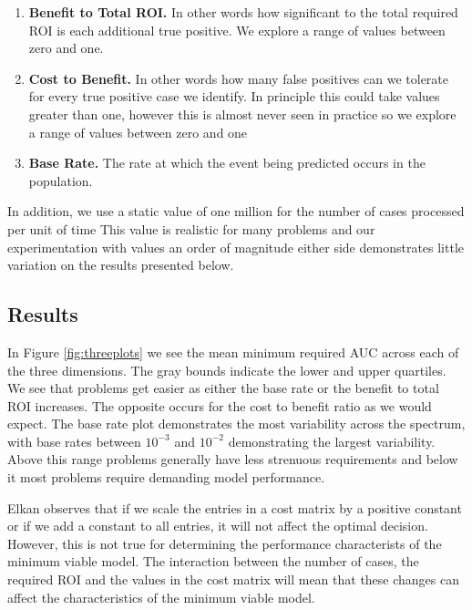 \documentclass[12pt,a4paper]{article}
\numberwithin{equation}{section}
\begin{document}
\begin{enumerate}
        \item \textbf{Benefit to Total ROI.} In other words how significant to the total required ROI is
each additional true positive. We explore a range of values between zero and one.

        \item \textbf{Cost to Benefit.} In other words how many false positives can we tolerate for every
true positive case we identify. In principle this could take values greater than one, however this
is almost never seen in practice so we explore a range of values between zero and one

        \item \textbf{Base Rate.} The rate at which the event being predicted occurs in the population.

\end{enumerate}

In addition, we use a static value of one million for the number of cases processed per unit of time
This value is realistic for many problems and our experimentation with values
an order of magnitude either side demonstrates little variation on the results presented below.

\subsection{Results}

In Figure \ref{fig:threeplots} we see the mean minimum required AUC across each of the three dimensions.
The gray bounds indicate the lower and upper quartiles. We see that problems get easier as either the base
rate or the benefit to total ROI increases. The opposite occurs for the cost to benefit ratio as we would 
expect. The base rate plot demonstrates the most variability across the spectrum, with base rates between
$10^{-3}$ and $10^{-2}$ demonstrating the largest variability. Above this range problems generally have less
strenuous requirements and below it most problems require demanding model performance.

Elkan \cite{Elkan2001} observes that if we scale the entries in a cost matrix by a positive constant or if
we add a constant to all entries, it will not affect the optimal decision. However, this
is not true for determining the performance characterists of the minimum viable model. 
The interaction between the number of cases, the required ROI and the values in the cost
matrix will mean that these changes can affect the characteristics of the minimum viable model. 
\end{document}
